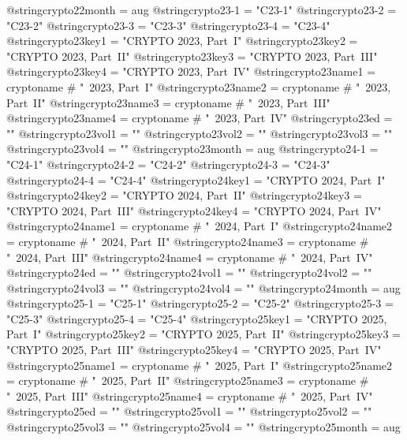 @string{crypto22month =         aug}
@string{crypto23-1 =            "C23-1"}
@string{crypto23-2 =            "C23-2"}
@string{crypto23-3 =            "C23-3"}
@string{crypto23-4 =            "C23-4"}
@string{crypto23key1 =          "CRYPTO 2023, Part~I"}
@string{crypto23key2 =          "CRYPTO 2023, Part~II"}
@string{crypto23key3 =          "CRYPTO 2023, Part~III"}
@string{crypto23key4 =          "CRYPTO 2023, Part~IV"}
@string{crypto23name1 =         cryptoname # "~2023, Part~I"}
@string{crypto23name2 =         cryptoname # "~2023, Part~II"}
@string{crypto23name3 =         cryptoname # "~2023, Part~III"}
@string{crypto23name4 =         cryptoname # "~2023, Part~IV"}
@string{crypto23ed =            ""}
@string{crypto23vol1 =          ""}
@string{crypto23vol2 =          ""}
@string{crypto23vol3 =          ""}
@string{crypto23vol4 =          ""}
@string{crypto23month =         aug}
@string{crypto24-1 =            "C24-1"}
@string{crypto24-2 =            "C24-2"}
@string{crypto24-3 =            "C24-3"}
@string{crypto24-4 =            "C24-4"}
@string{crypto24key1 =          "CRYPTO 2024, Part~I"}
@string{crypto24key2 =          "CRYPTO 2024, Part~II"}
@string{crypto24key3 =          "CRYPTO 2024, Part~III"}
@string{crypto24key4 =          "CRYPTO 2024, Part~IV"}
@string{crypto24name1 =         cryptoname # "~2024, Part~I"}
@string{crypto24name2 =         cryptoname # "~2024, Part~II"}
@string{crypto24name3 =         cryptoname # "~2024, Part~III"}
@string{crypto24name4 =         cryptoname # "~2024, Part~IV"}
@string{crypto24ed =            ""}
@string{crypto24vol1 =          ""}
@string{crypto24vol2 =          ""}
@string{crypto24vol3 =          ""}
@string{crypto24vol4 =          ""}
@string{crypto24month =         aug}
@string{crypto25-1 =            "C25-1"}
@string{crypto25-2 =            "C25-2"}
@string{crypto25-3 =            "C25-3"}
@string{crypto25-4 =            "C25-4"}
@string{crypto25key1 =          "CRYPTO 2025, Part~I"}
@string{crypto25key2 =          "CRYPTO 2025, Part~II"}
@string{crypto25key3 =          "CRYPTO 2025, Part~III"}
@string{crypto25key4 =          "CRYPTO 2025, Part~IV"}
@string{crypto25name1 =         cryptoname # "~2025, Part~I"}
@string{crypto25name2 =         cryptoname # "~2025, Part~II"}
@string{crypto25name3 =         cryptoname # "~2025, Part~III"}
@string{crypto25name4 =         cryptoname # "~2025, Part~IV"}
@string{crypto25ed =            ""}
@string{crypto25vol1 =          ""}
@string{crypto25vol2 =          ""}
@string{crypto25vol3 =          ""}
@string{crypto25vol4 =          ""}
@string{crypto25month =         aug}

